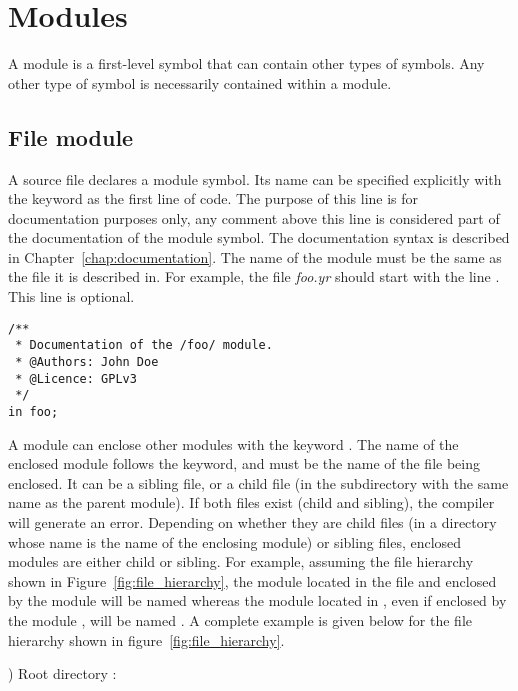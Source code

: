 \section{Modules}%
\label{sec:modules}

A module is a first-level symbol that can contain other types of symbols. Any
other type of symbol is necessarily contained within a module.

\subsection{File module}

A source file declares a module symbol. Its name can be specified explicitly
with the keyword  as the first line of code. The purpose of this line
is for documentation purposes only, any comment above this line is considered
part of the documentation of the module symbol. The documentation syntax is
described in Chapter~\ref{chap:documentation}. The name of the module must
be the same as the file it is described in. For example, the file
\textit{foo.yr} should start with the line . This line is
optional.


\begin{lstlisting}[style=coloredverbatim]
/**
 * Documentation of the /foo/ module.
 * @Authors: John Doe
 * @Licence: GPLv3
 */
in foo;
\end{lstlisting}

A module can enclose other modules with the keyword . The name of
the enclosed module follows the keyword, and must be the name of the file being
enclosed. It can be a sibling file, or a child file (in the subdirectory with
the same name as the parent module). If both files exist (child and sibling),
the compiler will generate an error. Depending on whether they are child files
(in a directory whose name is the name of the enclosing module) or sibling
files, enclosed modules are either child or sibling. For example, assuming the
file hierarchy shown in Figure~\ref{fig:file_hierarchy}, the module located in
the file  and enclosed by the module  will
be named  whereas the module located in , even
if enclosed by the module , will be named . A complete
example is given below for the file hierarchy shown in
figure~\ref{fig:file_hierarchy}.



) Root directory :


